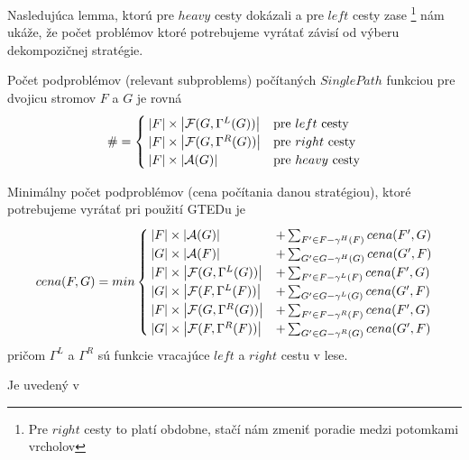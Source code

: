 Nasledujúca lemma, ktorú pre $heavy$ cesty dokázali \citet{DMRW}
a pre $left$ cesty zase \citet{ZHANGSHASHA}
\footnote{Pre $right$ cesty to platí obdobne, stačí nám zmeniť poradie medzi potomkami vrcholov}
nám ukáže, že počet problémov ktoré potrebujeme vyrátať závisí od výberu dekompozičnej stratégie.

\begin{lemma}
  Počet podproblémov (relevant subproblems) počítaných $SinglePath$ funkciou pre dvojicu
  stromov $F$ a $G$ je rovná
  \begin{align*}
    \# = 
    \begin{cases}
      \left|{F}\right| \times \left|{\mathcal{F}(G, \Gamma^{L}(G))}\right| & \text{pre $left$ cesty}
      \\
      \left|{F}\right| \times \left|{\mathcal{F}(G, \Gamma^{R}(G))}\right| & \text{pre $right$ cesty}
      \\
      \left|{F}\right| \times \left|{\mathcal{A}(G)}\right| & \text{pre $heavy$ cesty}
    \end{cases}
  \end{align*}
\end{lemma}

\begin{lemma}
  Minimálny počet podproblémov (cena počítania danou stratégiou),
  ktoré potrebujeme vyrátať pri použití GTEDu je
  \begin{align*}
    cena(F, G) = min
    \begin{cases}
      \left|{F}\right| \times \left|{\mathcal{A}(G)}\right| &+ \sum_{{F}' \in F - \gamma^{H}(F)}cena({F}', G)
      \\
      \left|{G}\right| \times \left|{\mathcal{A}(F)}\right| &+ \sum_{{G}' \in G - \gamma^{H}(G)}cena({G}', F)
      \\
      \left|{F}\right| \times \left|{\mathcal{F}(G, \Gamma^{L}(G))}\right| &+ \sum_{{F}' \in F - \gamma^{L}(F)}cena({F}', G)
      \\
      \left|{G}\right| \times \left|{\mathcal{F}(F, \Gamma^{L}(F))}\right| &+ \sum_{{G}' \in G - \gamma^{L}(G)}cena({G}', F)
      \\
      \left|{F}\right| \times \left|{\mathcal{F}(G, \Gamma^{R}(G))}\right| &+ \sum_{{F}' \in F - \gamma^{R}(F)}cena({F}', G)
      \\
      \left|{G}\right| \times \left|{\mathcal{F}(F, \Gamma^{R}(F))}\right| &+ \sum_{{G}' \in G - \gamma^{R}(G)}cena({G}', F)
    \end{cases}
  \end{align*}
  pričom $\Gamma^{L}$ a $\Gamma^{R}$ sú funkcie vracajúce $left$ a $right$ cestu v lese.
\end{lemma}

\begin{dukaz}
  Je uvedený v 
\end{dukaz}

